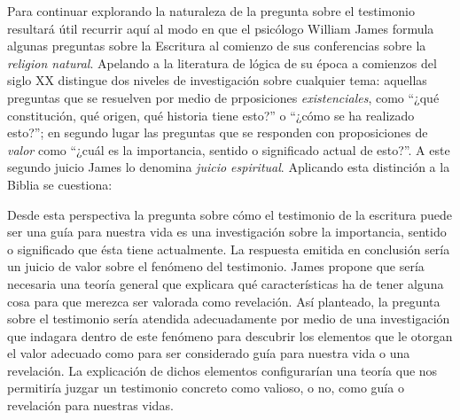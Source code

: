       Para continuar explorando la naturaleza de la pregunta sobre el testimonio
      resultará útil recurrir aquí al modo en que el psicólogo William James formula
      algunas preguntas sobre la Escritura al comienzo de sus conferencias sobre la
      \emph{religion natural}. Apelando a la literatura de lógica de su época a
      comienzos del siglo XX distingue dos niveles de investigación sobre cualquier
      tema: aquellas preguntas que se resuelven por medio de prposiciones
      \emph{existenciales}, como ``¿qué constitución, qué origen, qué historia tiene
      esto?'' o ``¿cómo se ha realizado esto?''; en segundo lugar las preguntas que se
      responden con proposiciones de \emph{valor} como ``¿cuál es la importancia,
      sentido o significado actual de esto?''. A este segundo juicio James lo denomina
      \emph{juicio espiritual}. Aplicando esta distinción a la Biblia se cuestiona:


      Desde esta perspectiva la pregunta sobre cómo el testimonio de la escritura
      puede ser una guía para nuestra vida es una investigación sobre la importancia,
      sentido o significado que ésta tiene actualmente. La respuesta emitida en
      conclusión sería un juicio de valor sobre el fenómeno del testimonio. James
      propone que sería necesaria una teoría general que explicara qué características
      ha de tener alguna cosa para que merezca ser valorada como revelación. Así
      planteado, la pregunta sobre el testimonio sería atendida adecuadamente por
      medio de una investigación que indagara dentro de este fenómeno para descubrir
      los elementos que le otorgan el valor adecuado como para ser considerado guía
      para nuestra vida o una revelación. La explicación de dichos elementos
      configurarían una teoría que nos permitiría juzgar un testimonio concreto como
      valioso, o no, como guía o revelación para nuestras vidas.

